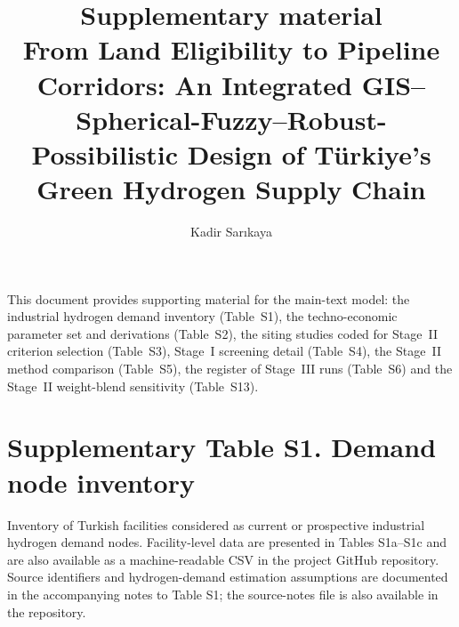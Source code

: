 \documentclass[11pt,a4paper]{article}
\title{Supplementary material\\[2mm]
\large From Land Eligibility to Pipeline Corridors: An Integrated
GIS--Spherical-Fuzzy--Robust-Possibilistic Design of T\"urkiye's Green
Hydrogen Supply Chain}
\author{Kadir Sarıkaya}
\date{}
\begin{document}
\maketitle
\noindent This document provides supporting material for the main-text model:
the industrial hydrogen demand inventory (Table~S1), the techno-economic
parameter set and derivations (Table~S2), the siting studies coded for Stage~II
criterion selection (Table~S3), Stage~I screening detail (Table~S4), the Stage~II method comparison (Table~S5),
the register of Stage~III runs (Table~S6) and the Stage~II weight-blend sensitivity (Table~S13).
\tableofcontents
\newpage


\section{Supplementary Table S1. Demand node inventory}

Inventory of Turkish facilities considered as current or prospective industrial hydrogen demand nodes. Facility-level data are presented in Tables S1a--S1c and are also available as a machine-readable CSV in the project GitHub repository. Source identifiers and hydrogen-demand estimation assumptions are documented in the accompanying notes to Table S1; the source-notes file is also available in the repository.
\end{document}
